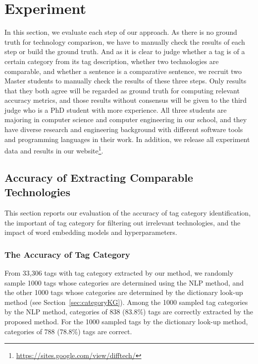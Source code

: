 \section{Experiment}
\label{sec:experiment}
In this section, we evaluate each step of our approach.
As there is no ground truth for technology comparison, we have to manually check the results of each step or build the ground truth.
And as it is clear to judge whether a tag is of a certain category from its tag description, whether two technologies are comparable, and whether a sentence is a comparative sentence, we recruit two Master students to manually check the results of these three steps.
Only results that they both agree will be regarded as ground truth for computing relevant accuracy metrics, and those results without consensus will be given to the third judge who is a PhD student with more experience.
All three students are majoring in computer science and computer engineering in our school, and they have diverse research and engineering background with different software tools and programming languages in their work.
In addition, we release all experiment data and results in our website\footnote{\url{https://sites.google.com/view/difftech/}}.
 

\subsection{Accuracy of Extracting Comparable Technologies}
This section reports our evaluation of the accuracy of tag category identification, the important of tag category for filtering out irrelevant technologies, and the impact of word embedding models and hyperparameters.

\subsubsection{The Accuracy of Tag Category}
From 33,306 tags with tag category extracted by our method, we randomly sample 1000 tags whose categories are determined using the NLP method, and the other 1000 tags whose categories are determined by the dictionary look-up method (see Section~\ref{sec:categoryKG}).
Among the 1000 sampled tag categories by the NLP method, categories of 838 (83.8\%) tags are correctly extracted by the proposed method.
For the 1000 sampled tags by the dictionary look-up method, categories of 788 (78.8\%) tags are correct.

